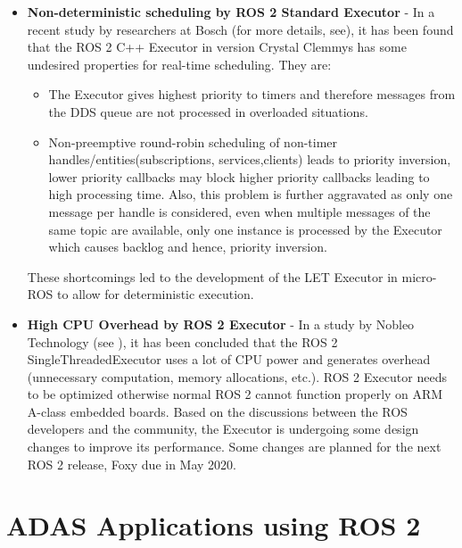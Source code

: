 \documentclass[%
xelatex,
	oneside,		%
	12pt,			%
	parskip=half,	%
	abstracton,
	chapterprefix=true%
    appendixprefix=true]
{scrbook}
\begin{document}
\begin{itemize}
\begin{center}
[Inverted Pendulum Setup]{Inverted Pendulum Setup\cite{deadline}}
\label{fig:inverpen}
\end{center}
\item {\bfseries Non-deterministic scheduling by ROS 2 Standard Executor} - In a recent study by researchers at Bosch (for more details, see\cite{ingo}), it has been found that the ROS 2 C++ Executor in version Crystal Clemmys has some undesired properties for real-time scheduling. They are:
\begin{itemize}
\item The Executor gives highest priority to timers and therefore messages from the DDS queue are not processed in overloaded situations.
\item Non-preemptive round-robin scheduling of non-timer handles/entities(subscriptions, services,clients) leads to priority inversion, lower priority callbacks may block higher priority callbacks leading to high processing time. Also, this problem is further aggravated as only one message per handle is considered, even when multiple messages of the same topic are available, only one instance is processed by the Executor which causes backlog and hence, priority inversion. 
\end{itemize} 
These shortcomings led to the development of the LET Executor in micro-ROS to allow for deterministic execution.
\item {\bfseries High CPU Overhead by ROS 2 Executor} - In a study by Nobleo Technology (see \cite{nobleo}), it has been concluded that the ROS 2 SingleThreadedExecutor uses a lot of CPU power and generates overhead (unnecessary computation, memory allocations, etc.). ROS 2 Executor needs to be optimized otherwise normal ROS 2 cannot function properly on ARM A-class embedded boards. Based on the discussions between the ROS developers and the community, the Executor is undergoing some design changes to improve its performance. Some changes are planned for the next ROS 2 release, Foxy due in May 2020.
\end{itemize}


	\chapter{ADAS Applications using ROS 2}
		
\end{document}
